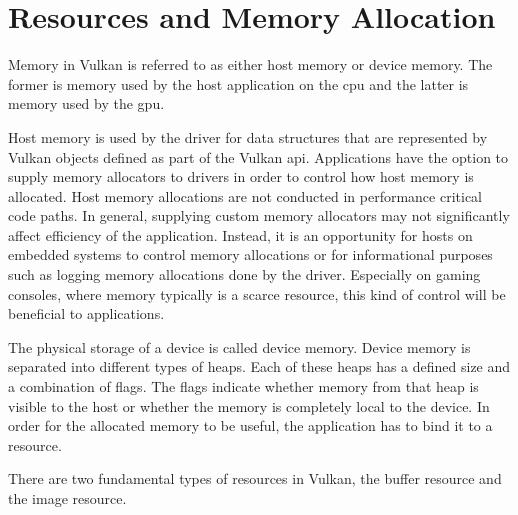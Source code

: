  \section{Resources and Memory Allocation}
  \label{sec:MemoryManagement}
    Memory in Vulkan is referred to as either host memory or device memory.
    The former is memory used by the host application on the \gls{cpu} and the latter is memory used by the \gls{gpu}.

    Host memory is used by the \gls{driver} for data structures that are represented by Vulkan objects defined as part of the Vulkan \gls{api}.
    Applications have the option to supply memory allocators to \glspl{driver} in order to control how host memory is allocated.
    Host memory allocations are not conducted in performance critical code paths.
    In general, supplying custom memory allocators may not significantly affect efficiency of the application.
    Instead, it is an opportunity for hosts on embedded systems to control memory allocations or for informational purposes such as logging memory allocations done by the \gls{driver}.
    Especially on gaming consoles, where memory typically is a scarce resource, this kind of control will be beneficial to applications.

    The physical storage of a device is called device memory. Device memory is separated into different types of heaps. Each of these heaps has a defined size and a combination of flags. The flags indicate whether memory from that heap is visible to the host or whether the memory is completely local to the device. In order for the allocated memory to be useful, the application has to bind it to a resource.

    There are two fundamental types of resources in Vulkan, the buffer resource and the image resource.

